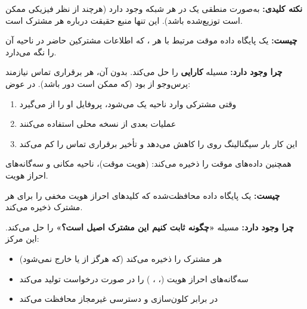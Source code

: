 \begin{CNinsight}

\textbf{نکته کلیدی:} به‌صورت منطقی یک  در هر شبکه وجود دارد (هرچند از نظر فیزیکی ممکن است توزیع‌شده باشد). این تنها منبع حقیقت درباره هر مشترک است.

\end{CNinsight}


\textbf{چیست:} یک پایگاه داده موقت مرتبط با هر ، که اطلاعات مشترکین حاضر در ناحیه آن  را نگه می‌دارد.

\textbf{چرا وجود دارد:}  مسیله \textbf{کارایی} را حل می‌کند. بدون آن، هر برقراری تماس نیازمند پرس‌وجو از  بود (که ممکن است دور باشد). در عوض:

\begin{enumerate}
\def\labelenumi{\arabic{enumi}.}
\tightlist
\item
  وقتی مشترکی وارد ناحیه یک  می‌شود،  پروفایل او را از  می‌گیرد
\item
  عملیات بعدی از نسخه محلی  استفاده می‌کنند
\item
  این کار بار سیگنالینگ روی  را کاهش می‌دهد و تأخیر برقراری تماس را کم می‌کند
\end{enumerate}

 همچنین داده‌های موقت را ذخیره می‌کند:  (هویت موقت)، ناحیه مکانی و سه‌گانه‌های احراز هویت.


\textbf{چیست:} یک پایگاه داده محافظت‌شده که کلیدهای احراز هویت مخفی  را برای هر مشترک ذخیره می‌کند.

\textbf{چرا وجود دارد:}  مسیله \textbf{«چگونه ثابت کنیم این مشترک اصیل است؟»} را حل می‌کند. این مرکز:

\begin{itemize}
\tightlist
\item
   هر مشترک را ذخیره می‌کند (که هرگز از  یا  خارج نمی‌شود)
\item
  سه‌گانه‌های احراز هویت (، ، ) را در صورت درخواست تولید می‌کند
\item
  در برابر کلون‌سازی و دسترسی غیرمجاز محافظت می‌کند
\end{itemize}

